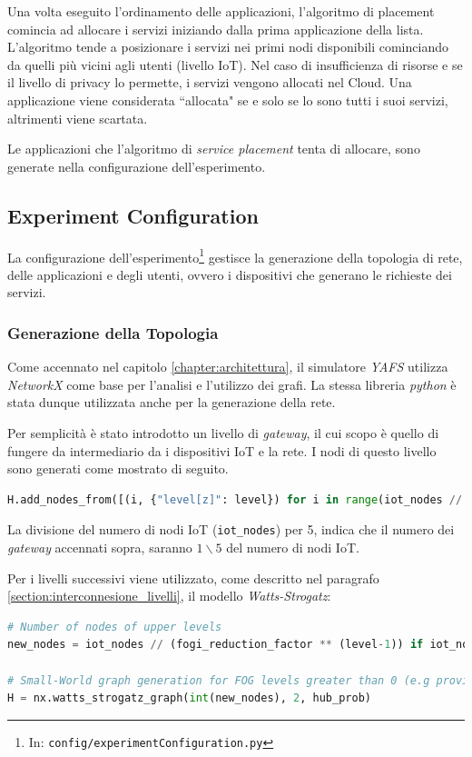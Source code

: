 Una volta eseguito l'ordinamento delle applicazioni, l'algoritmo di placement comincia ad allocare i servizi iniziando dalla prima applicazione della lista. L'algoritmo tende a posizionare i servizi nei primi nodi disponibili cominciando da quelli più vicini agli utenti (livello IoT). Nel caso di insufficienza di risorse e se il livello di privacy lo permette, i servizi vengono allocati nel Cloud. Una applicazione viene considerata ``allocata" se e solo se lo sono tutti i suoi servizi, altrimenti viene scartata.

Le applicazioni che l'algoritmo di \textit{service placement} tenta di allocare, sono generate nella configurazione dell'esperimento.

\subsection{Experiment Configuration}

La configurazione dell'esperimento\footnote{In: \texttt{config/experimentConfiguration.py}} gestisce la generazione della topologia di rete, delle applicazioni e degli utenti, ovvero i dispositivi che generano le richieste dei servizi.

\subsubsection{Generazione della Topologia}

Come accennato nel capitolo \ref{chapter:architettura}, il simulatore \textit{YAFS} utilizza \textit{NetworkX} come base per l'analisi e l'utilizzo dei grafi. La stessa libreria \textit{python} è stata dunque utilizzata anche per la generazione della rete.

Per semplicità è stato introdotto un livello di \textit{gateway}, il cui scopo è quello di fungere da intermediario da i dispositivi IoT e la rete. I nodi di questo livello sono generati come mostrato di seguito.

\begin{lstlisting}[language=python]
H.add_nodes_from([(i, {"level[z]": level}) for i in range(iot_nodes // 5)])
\end{lstlisting}

La divisione del numero di nodi IoT (\texttt{iot\_nodes}) per 5, indica che il numero dei \textit{gateway} accennati sopra, saranno $1\backslash 5$ del numero di nodi IoT.

Per i livelli successivi viene utilizzato, come descritto nel paragrafo \ref{section:interconnesione_livelli}, il modello \textit{Watts-Strogatz}:
\begin{lstlisting}[language=python]
# Number of nodes of upper levels
new_nodes = iot_nodes // (fogi_reduction_factor ** (level-1)) if iot_nodes // (fogi_reduction_factor**(level-1)) >= 2 else 2
                
# Small-World graph generation for FOG levels greater than 0 (e.g provincial fog nodes)
H = nx.watts_strogatz_graph(int(new_nodes), 2, hub_prob)
\end{lstlisting}





